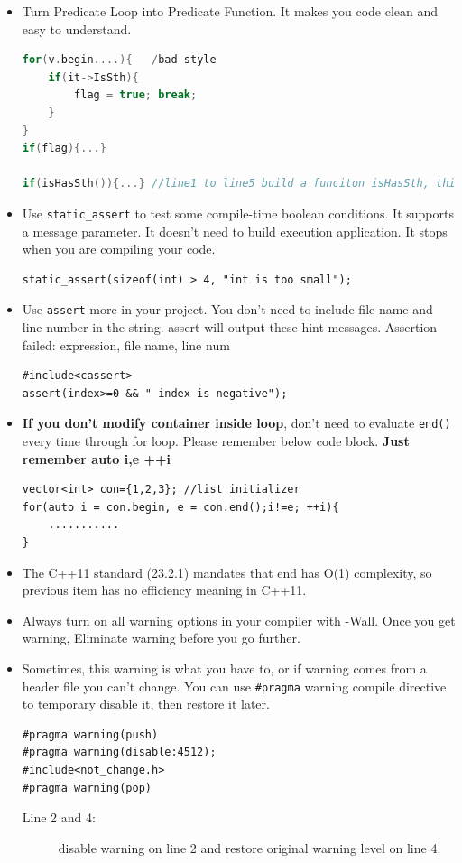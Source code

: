 \documentclass[a4paper,11pt,twoside]{book}
\begin{document}
\begin{itemize}
	\item Turn Predicate Loop into Predicate Function. It makes you code clean and easy to understand.
	
\begin{lstlisting}[frame=single, language=c++]
for(v.begin....){   /bad style
	if(it->IsSth){
		flag = true; break;
	}
}
if(flag){...}
	
if(isHasSth()){...} //line1 to line5 build a funciton isHasSth, this is good style
\end{lstlisting}
	
	\item Use \texttt{static\_assert} to test some compile-time boolean conditions. It supports a message parameter. It doesn't need to build execution application. It stops when you are compiling your code. 
\begin{lstlisting}[numbers=none]
static_assert(sizeof(int) > 4, "int is too small");
\end{lstlisting}
	
	\item Use \texttt{assert} more in your project. You don't need to include file name and line number in the string. assert will output these hint messages. Assertion failed: expression, file name, line num
\begin{lstlisting}[numbers=none]
#include<cassert>
assert(index>=0 && " index is negative");
\end{lstlisting}

	
	\item \textbf{If you don't modify container inside loop}, don't need to evaluate \texttt{end()} every time through for loop. Please remember below code block. \textbf{Just remember auto i,e ++i}

\begin{lstlisting}[numbers=none]
vector<int> con={1,2,3}; //list initializer
for(auto i = con.begin, e = con.end();i!=e; ++i){
	...........
}
\end{lstlisting}
	
	\item The C++11 standard (23.2.1) mandates that end has O(1) complexity, so previous item has no efficiency meaning in C++11.
	
	
	
	\item Always turn on all warning options in your compiler with -Wall. Once you get warning, Eliminate warning before you go further.
	
	\item Sometimes, this warning is what you have to, or if warning comes from a header file you can't change. You can use \texttt{\#pragma} warning compile directive to temporary disable it, then restore it later.
\begin{lstlisting}[numbers=none]
#pragma warning(push)
#pragma warning(disable:4512);
#include<not_change.h>
#pragma warning(pop)
\end{lstlisting}
\begin{description}
	\item[Line 2 and 4:] disable warning on line 2 and restore original warning level on line 4.
\end{description}
	

\end{itemize}
\end{document}

